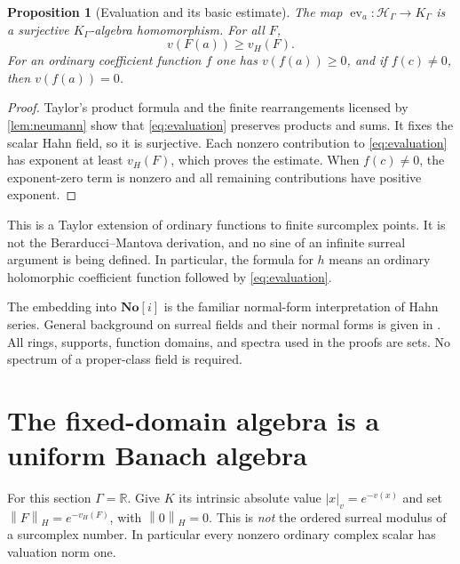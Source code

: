 \documentclass[11pt,letterpaper]{article}
\numberwithin{equation}{section}
\newtheorem{proposition}[theorem]{Proposition}
\theoremstyle{definition}
\theoremstyle{remark}
\newcommand{\R}{\mathbb R}
\newcommand{\No}{\mathbf{No}}
\newcommand{\HH}{\mathcal H}
\newcommand{\vH}{v_{\!H}}
\newcommand{\ev}{\operatorname{ev}}
\newcommand{\norm}[1]{\left\lVert#1\right\rVert}
\begin{document}
\begin{proposition}[Evaluation and its basic estimate]\label{prop:eval}
The map $\ev_a:\HH_\Gamma\to K_\Gamma$ is a surjective $K_\Gamma$-algebra
homomorphism. For all $F$,
\begin{equation}\label{eq:eval-bound}
 v(F(a))\ge\vH(F).
\end{equation}
For an ordinary coefficient function $f$ one has $v(f(a))\ge0$, and if
$f(c)\ne0$, then $v(f(a))=0$.
\end{proposition}
\begin{proof}
Taylor's product formula and the finite rearrangements licensed by
\cref{lem:neumann} show that \eqref{eq:evaluation} preserves products and
sums. It fixes the scalar Hahn field, so it is surjective. Each
nonzero contribution to \eqref{eq:evaluation} has exponent at least
$\vH(F)$, which proves the estimate. When $f(c)\ne0$, the exponent-zero
term is nonzero and all remaining contributions have positive exponent.
\end{proof}

This is a Taylor extension of ordinary functions to finite surcomplex
points. It is not the Berarducci--Mantova derivation, and no sine of an
infinite surreal argument is being defined. In particular, the formula
for $h$ means an ordinary holomorphic coefficient function followed by
\eqref{eq:evaluation}.

The embedding into $\No[i]$ is the familiar normal-form interpretation of
Hahn series. General background on surreal fields and their normal forms
is given in \cite{Gonshor,vdDE}. All rings, supports, function domains, and
spectra used in the proofs are sets. No spectrum of a proper-class field
is required.

\section{The fixed-domain algebra is a uniform Banach algebra}
\label{sec:banach}
For this section $\Gamma=\R$. Give $K$ its intrinsic absolute value
$|x|_v=e^{-v(x)}$ and set $\norm F_H=e^{-\vH(F)}$, with
$\norm0_H=0$. This is \emph{not} the ordered surreal modulus of a
surcomplex number. In particular every nonzero ordinary complex scalar
has valuation norm one.
\end{document}
